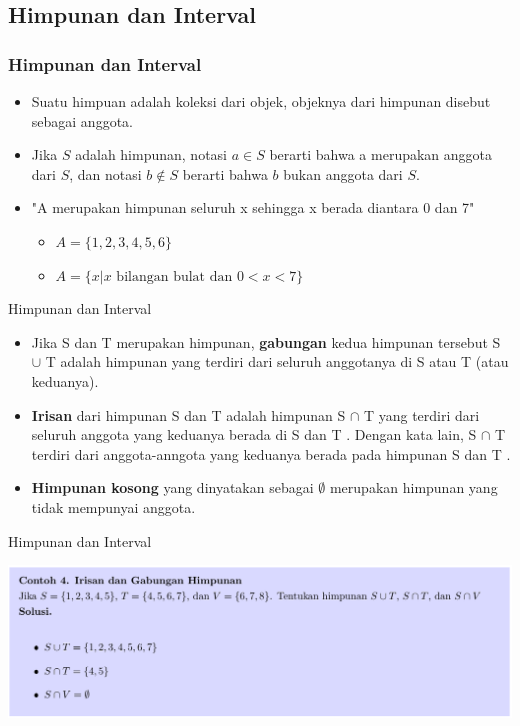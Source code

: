 \documentclass[pdflatex,compress,mathserif]{beamer}
\begin{document}
\subsection{Himpunan dan Interval}

\begin{frame}
	\frametitle{Himpunan dan Interval}
	\begin{itemize}
		\item Suatu himpuan adalah koleksi dari objek, objeknya dari himpunan disebut sebagai anggota.
		\item Jika $S$ adalah himpunan, notasi $a \in S$ berarti bahwa a merupakan anggota dari $S$, dan notasi $b \notin S$ berarti bahwa $b$ bukan anggota dari $S$.
		\item "A merupakan himpunan seluruh x sehingga x berada diantara 0 dan 7"
		\begin{itemize}
			\item[] $A = \{1, 2, 3, 4, 5, 6\}$
			\item[] $A = \{x|x \text{ bilangan bulat dan } 0 < x < 7\}$
		\end{itemize}
	\end{itemize}
\end{frame}

\begin{frame}{Himpunan dan Interval}
	\begin{itemize}
		\item Jika S dan T merupakan himpunan, \textbf{gabungan} kedua himpunan tersebut S $\cup$ T adalah himpunan yang terdiri dari seluruh anggotanya di S atau T (atau keduanya).
		\item \textbf{Irisan} dari himpunan S dan T adalah himpunan S $\cap$ T yang terdiri dari seluruh anggota yang keduanya berada di S dan T . Dengan kata lain, S $\cap$ T terdiri dari anggota-anngota yang keduanya berada pada himpunan S dan T .
		\item \textbf{Himpunan kosong} yang dinyatakan sebagai $\emptyset$ merupakan himpunan yang tidak mempunyai anggota.
	\end{itemize}
\end{frame}

\begin{frame}{Himpunan dan Interval}
	\begin{center}
		\includegraphics[width=\linewidth]{img/img13}
	\end{center}
\end{frame}
\end{document}
